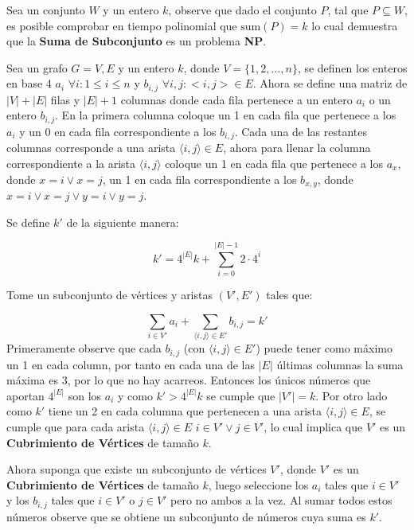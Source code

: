 \documentclass{article}
\begin{document}
Sea un conjunto $W$ y un entero $k$, observe que dado el conjunto $P$, tal que $P\subseteq W$, es posible comprobar en tiempo polinomial que $\text{sum}(P)=k$
lo cual demuestra que la \textbf{Suma de Subconjunto} es un problema \textbf{NP}.

Sea un grafo $G=V,E$ y un entero $k$, donde $V=\{1,2,\ldots,n\}$, se definen los enteros en base 4 $a_i$ $\forall i : 1\leq i \leq n$ y $b_{i,j}$ $\forall i,j : <i,j> \in E$.
Ahora se define una matriz de $|V|+|E|$ filas y $|E|+1$ columnas donde cada fila pertenece a un entero $a_i$ o un entero $b_{i,j}$. En la primera
columna coloque un 1 en cada fila que pertenece a los $a_i$ y un 0 en cada fila correspondiente a los $b_{i,j}$. Cada una de las restantes columnas
corresponde a una arista $\langle i,j \rangle\in E$, ahora para llenar la columna correspondiente a la arista $\langle i,j \rangle$ coloque un 1 en cada
fila que pertenece a los $a_x$, donde $x=i\vee x=j$, un 1 en cada fila correspondiente a los $b_{x,y}$, donde $x=i \vee x=j \vee y=i \vee y=j$.

Se define $k'$ de la siguiente manera:

\begin{equation}
    k'=4^{|E|}k+\sum_{i=0}^{|E|-1}2\cdot 4^i
\end{equation}

Tome un subconjunto de vértices y aristas $(V', E')$ tales que:

\begin{equation}
    \sum_{i\in V'} a_i + \sum_{\langle i,j\rangle \in E'} b_{i,j} = k'
\end{equation}
Primeramente observe que cada $b_{i,j}$ (con $\langle i,j\rangle \in E'$) puede tener como máximo un 1 en cada column, por tanto en cada una de
las $|E|$ últimas columnas la suma máxima es 3, por lo que no hay acarreos. Entonces los únicos números que aportan
$4^{|E|}$ son los $a_i$ y como $k'>4^{|E|}k$ se cumple que $|V'|=k$. Por otro lado como $k'$ tiene un 2 en cada columna que pertenecen
a una arista $\langle i,j\rangle \in E$, se cumple que para cada arista $\langle i,j\rangle \in E$ $i\in V'\vee j\in V'$, lo cual implica
que $V'$ es un \textbf{Cubrimiento de Vértices} de tamaño $k$.

Ahora suponga que existe un subconjunto de vértices $V'$, donde $V'$ es un \textbf{Cubrimiento de Vértices} de tamaño $k$, luego seleccione
los $a_i$ tales que $i\in V'$ y los $b_{i,j}$ tales que $i\in V'$ o $j\in V'$ pero no ambos a la vez. Al sumar todos estos números
observe que se obtiene un subconjunto de números cuya suma es $k'$.
\end{document}
